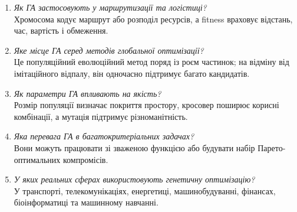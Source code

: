 \documentclass[12pt,a4paper]{article}
\begin{document}
\begin{enumerate}[leftmargin=*]
Розміщення компонентів, налаштування регуляторів, проєктування конструкцій, планування виробництва й оптимізація мереж.
\item \textit{Як ГА застосовують у маршрутизації та логістиці?}\\
Хромосома кодує маршрут або розподіл ресурсів, а fitness враховує відстань, час, вартість і обмеження.
\item \textit{Яке місце ГА серед методів глобальної оптимізації?}\\
Це популяційний еволюційний метод поряд із роєм частинок; на відміну від імітаційного відпалу, він одночасно підтримує багато кандидатів.
\item \textit{Як параметри ГА впливають на якість?}\\
Розмір популяції визначає покриття простору, кросовер поширює корисні комбінації, а мутація підтримує різноманітність.
\item \textit{Яка перевага ГА в багатокритеріальних задачах?}\\
Вони можуть працювати зі зваженою функцією або будувати набір Парето-оптимальних компромісів.
\item \textit{У яких реальних сферах використовують генетичну оптимізацію?}\\
У транспорті, телекомунікаціях, енергетиці, машинобудуванні, фінансах, біоінформатиці та машинному навчанні.
\end{enumerate}
\end{document}
